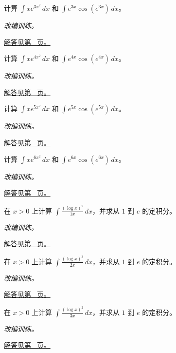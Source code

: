 \documentclass[UTF8,12pt,a4paper,fontset=fandol]{ctexart}
\begin{document}
\begin{example}[指数复合的反向链式法则]\label{ex:c12q15}
计算 $\displaystyle\int x e^{3x^2}\,dx$ 和 $\displaystyle\int e^{3x}\cos(e^{3x})\,dx$。
\par\textit{改编训练。}\par\hyperref[ans:c12q15]{解答见第~\pageref{ans:c12q15} 页。}
\end{example}
\begin{example}[指数复合的反向链式法则]\label{ex:c12q16}
计算 $\displaystyle\int x e^{4x^2}\,dx$ 和 $\displaystyle\int e^{4x}\cos(e^{4x})\,dx$。
\par\textit{改编训练。}\par\hyperref[ans:c12q16]{解答见第~\pageref{ans:c12q16} 页。}
\end{example}
\begin{example}[指数复合的反向链式法则]\label{ex:c12q17}
计算 $\displaystyle\int x e^{5x^2}\,dx$ 和 $\displaystyle\int e^{5x}\cos(e^{5x})\,dx$。
\par\textit{改编训练。}\par\hyperref[ans:c12q17]{解答见第~\pageref{ans:c12q17} 页。}
\end{example}
\begin{example}[指数复合的反向链式法则]\label{ex:c12q18}
计算 $\displaystyle\int x e^{6x^2}\,dx$ 和 $\displaystyle\int e^{6x}\cos(e^{6x})\,dx$。
\par\textit{改编训练。}\par\hyperref[ans:c12q18]{解答见第~\pageref{ans:c12q18} 页。}
\end{example}
\begin{example}[对数幂与变量范围]\label{ex:c12q19}
在 $x>0$ 上计算 $\displaystyle\int\frac{(\log x)^{2}}{1x}\,dx$，并求从 $1$ 到 $e$ 的定积分。
\par\textit{改编训练。}\par\hyperref[ans:c12q19]{解答见第~\pageref{ans:c12q19} 页。}
\end{example}
\begin{example}[对数幂与变量范围]\label{ex:c12q20}
在 $x>0$ 上计算 $\displaystyle\int\frac{(\log x)^{3}}{2x}\,dx$，并求从 $1$ 到 $e$ 的定积分。
\par\textit{改编训练。}\par\hyperref[ans:c12q20]{解答见第~\pageref{ans:c12q20} 页。}
\end{example}
\begin{example}[对数幂与变量范围]\label{ex:c12q21}
在 $x>0$ 上计算 $\displaystyle\int\frac{(\log x)^{2}}{3x}\,dx$，并求从 $1$ 到 $e$ 的定积分。
\par\textit{改编训练。}\par\hyperref[ans:c12q21]{解答见第~\pageref{ans:c12q21} 页。}
\end{example}
\end{document}

